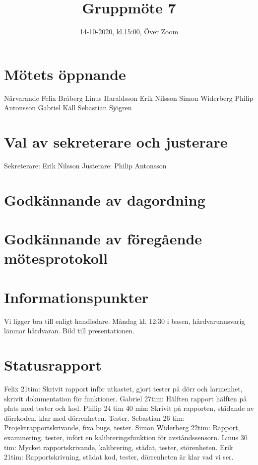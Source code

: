 \documentclass{article}
\title{Gruppmöte 7}
\date{14-10-2020, kl.15:00, Över Zoom}
\begin{document}
 \maketitle

\section{Mötets öppnande} 
Närvarande
Felix Bråberg
Linus Haraldsson
Erik Nilsson
Simon Widerberg
Philip Antonsson
Gabriel Käll
Sebastian Sjögren

\section{Val av sekreterare och justerare} 
Sekreterare: Erik Nilsson
\newline
Justerare: Philip Antonsson

\section{Godkännande av dagordning}

\section{Godkännande av föregående mötesprotokoll} 

\section{Informationspunkter} 
Vi ligger bra till enligt handledare.
Måndag kl. 12:30 i basen, hårdvaruansvarig lämnar hårdvaran.
Bild till presentationen.


\section{Statusrapport}
Felix 21tim: Skrivit rapport inför utkastet, gjort tester på  dörr och larmenhet, skrivit dokumentation för funktioner.
\newline
Gabriel 27tim: Hälften rapport hälften på plats med tester och kod.
\newline
Philip 24 tim 40 min: Skrivit på rapporten, städande av dörrkoden, klar med dörrenheten. Tester.
\newline
Sebastian 26 tim: Projektrapportskrivande, fixa bugs, tester.
\newline
Simon Widerberg 22tim: Rapport, examinering, tester, infört en kalibreringsfunktion för avståndssensorn.
\newline
Linus 30 tim: Mycket rapportskrivande, kalibrering, städat, tester, störenheten.
\newline
Erik 21tim: Rapportskrivning, städat kod, tester, dörrenheten är klar vad vi ser.
\end{document}
